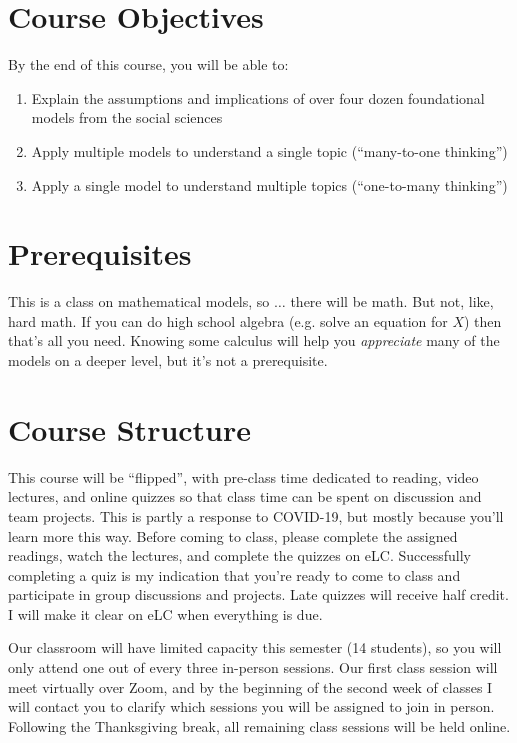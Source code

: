 \documentclass[11pt, letterpaper]{article}
\begin{document}
\section*{Course Objectives}
By the end of this course, you will be able to:
\begin{enumerate}
	\item Explain the assumptions and implications of over four dozen foundational models from the social sciences
	\item Apply multiple models to understand a single topic (``many-to-one thinking'')
	\item Apply a single model to understand multiple topics (``one-to-many thinking'')
\end{enumerate}

\section*{Prerequisites}
This is a class on mathematical models, so $\ldots$ there will be math. But not, like, hard math. If you can do high school algebra (e.g. solve an equation for $X$) then that's all you need. Knowing some calculus will help you \textit{appreciate} many of the models on a deeper level, but it's not a prerequisite. 

\section*{Course Structure}

This course will be ``flipped'', with pre-class time dedicated to reading, video lectures, and online quizzes so that class time can be spent on discussion and team projects. This is partly a response to COVID-19, but mostly because you'll learn more this way. Before coming to class, please complete the assigned readings, watch the lectures, and complete the quizzes on eLC. Successfully completing a quiz is my indication that you're ready to come to class and participate in group discussions and projects. Late quizzes will receive half credit. I will make it clear on eLC when everything is due.

Our classroom will have limited capacity this semester (14 students), so you will only attend one out of every three in-person sessions. Our first class session will meet virtually over Zoom, and by the beginning of the second week of classes I will contact you to clarify which sessions you will be assigned to join in person. Following the Thanksgiving break, all remaining class sessions will be held online.
\end{document}
